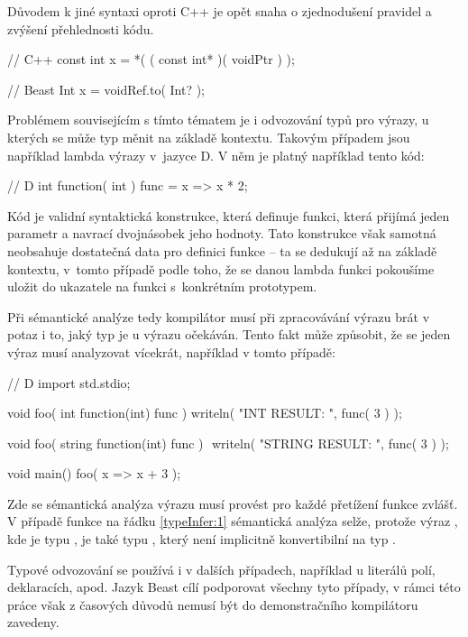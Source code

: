 Důvodem k jiné syntaxi oproti C++ je opět snaha o zjednodušení pravidel a zvýšení přehlednosti kódu.

\begin{cppcode}
// C++
const int x = *( ( const int* )( voidPtr ) );
\end{cppcode}

\begin{code}
// Beast
Int x = voidRef.to( Int? );
\end{code}

Problémem souvisejícím s tímto tématem je i odvozování typů pro výrazy, u kterých se může typ měnit na základě kontextu. Takovým případem jsou například lambda výrazy v~jazyce D. V něm je platný například tento kód:

\begin{dcode}
// D
int function( int ) func = x => x * 2;
\end{dcode}

Kód  je validní syntaktická konstrukce, která definuje funkci, která přijímá jeden parametr a navrací dvojnásobek jeho hodnoty. Tato konstrukce však samotná neobsahuje dostatečná data pro definici funkce -- ta se dedukují až na základě kontextu, v~tomto případě podle toho, že se danou lambda funkci pokoušíme uložit do ukazatele na funkci s~konkrétním prototypem.

Při sémantické analýze tedy kompilátor musí při zpracovávání výrazu brát v potaz i to, jaký typ je u výrazu očekáván. Tento fakt může způsobit, že se jeden výraz musí analyzovat vícekrát, například v tomto případě:
\begin{dcode}
// D
import std.stdio;

void foo( int function(int) func ) {
	writeln( "INT RESULT: ", func( 3 ) );
}

void foo( string function(int) func ) { $\label{typeInfer:1}$
	writeln( "STRING RESULT: ", func( 3 ) );
}

void main() {
	foo( x => x + 3 );
}
\end{dcode}

Zde se sémantická analýza výrazu  musí provést pro každé přetížení funkce  zvlášť. V případě funkce na řádku \ref{typeInfer:1} sémantická analýza selže, protože výraz , kde  je typu , je také typu , který není implicitně konvertibilní na typ .

Typové odvozování se používá i v dalších případech, například u literálů polí,  deklaracích, apod. Jazyk Beast cílí podporovat všechny tyto případy, v rámci této práce však z časových důvodů nemusí být do demonstračního kompilátoru zavedeny.

